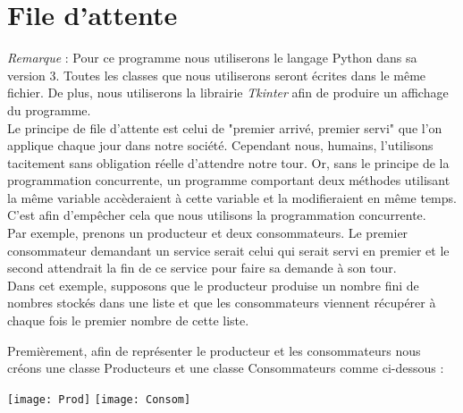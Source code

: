 \documentclass{article}
\begin{document}
\section{File d'attente}
\label{section:files}

\textit{Remarque} : Pour ce programme nous utiliserons le langage Python dans sa version 3. Toutes les classes que nous utiliserons seront \'{e}crites dans le m\^{e}me fichier. De plus, nous utiliserons la librairie \textit{Tkinter} afin de produire un affichage du programme.\\

Le principe de file d'attente est celui de "premier arriv\'{e}, premier servi" que l'on applique chaque jour dans notre soci\'{e}t\'{e}. Cependant nous, humains, l'utilisons tacitement sans obligation r\'{e}elle d'attendre notre tour. Or, sans le principe de la programmation concurrente, un programme comportant deux m\'{e}thodes utilisant la m\^{e}me variable acc\`{e}deraient \`{a} cette variable et la modifieraient en m\^{e}me temps. C'est afin d'emp\^{e}cher cela que nous utilisons la programmation concurrente.
\\ \indent Par exemple, prenons un producteur et deux consommateurs. Le premier consommateur demandant un service serait celui qui serait servi en premier et le second attendrait la fin de ce service pour faire sa demande \`{a} son tour. 
\\ \indent Dans cet exemple, supposons que le producteur produise un nombre fini de nombres stock\'{e}s dans une liste et que les consommateurs viennent r\'{e}cup\'{e}rer \`{a} chaque fois le premier nombre de cette liste.

Premi\`{e}rement, afin de repr\'{e}senter le producteur et les consommateurs nous cr\'{e}ons une classe Producteurs et une classe Consommateurs comme ci-dessous :\\
\begin{center}
\texttt{[image: Prod]} {} {} {} {} {} {} \texttt{[image: Consom]}
\end{center}
\end{document}
